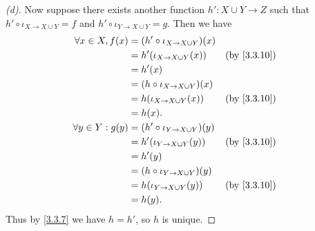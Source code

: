 \begin{proof}[(d)]
  Now suppose there exists another function \(h' : X \cup Y \to Z\) such that \(h' \circ \iota_{X \to X \cup Y} = f\) and \(h' \circ \iota_{Y \to X \cup Y} = g\).
  Then we have
  \begin{align*}
    \forall x \in X, f(x)  & = (h' \circ \iota_{X \to X \cup Y})(x)                  \\
                           & = h'(\iota_{X \to X \cup Y}(x))        &  & \by{3.3.10} \\
                           & = h'(x)                                                 \\
                           & = (h \circ \iota_{X \to X \cup Y})(x)                   \\
                           & = h(\iota_{X \to X \cup Y}(x))         &  & \by{3.3.10} \\
                           & = h(x).                                                 \\
    \forall y \in Y : g(y) & = (h' \circ \iota_{Y \to X \cup Y})(y)                  \\
                           & = h'(\iota_{Y \to X \cup Y}(y))        &  & \by{3.3.10} \\
                           & = h'(y)                                                 \\
                           & = (h \circ \iota_{Y \to X \cup Y})(y)                   \\
                           & = h(\iota_{Y \to X \cup Y}(y))         &  & \by{3.3.10} \\
                           & = h(y).
  \end{align*}
  Thus by \cref{3.3.7} we have \(h = h'\), so \(h\) is unique.
\end{proof}
